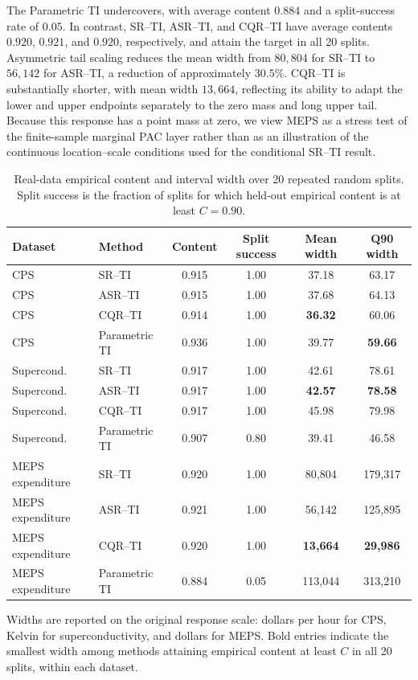 The Parametric TI undercovers, with average content \(0.884\) and a
split-success rate of \(0.05\). In contrast, SR--TI, ASR--TI, and CQR--TI have
average contents \(0.920\), \(0.921\), and \(0.920\), respectively, and attain
the target in all 20 splits. Asymmetric tail scaling reduces the mean width from
\(80{,}804\) for SR--TI to \(56{,}142\) for ASR--TI, a reduction of
approximately \(30.5\%\). CQR--TI is substantially shorter, with mean width
\(13{,}664\), reflecting its ability to adapt the lower and upper endpoints
separately to the zero mass and long upper tail. Because this response has a
point mass at zero, we view MEPS as a stress test of the finite-sample marginal
PAC layer rather than as an illustration of the continuous location--scale
conditions used for the conditional SR--TI result.

\begin{table}[H]
\centering
\caption{Real-data empirical content and interval width over 20 repeated random
splits. Split success is the fraction of splits for which held-out empirical
content is at least \(C=0.90\).}
\label{tab:real-data-summary}
\small
\begin{tabular}{llcccc}
\toprule
Dataset & Method & Content & Split success & Mean width & Q90 width \\
\midrule
CPS & SR--TI          & 0.915 & 1.00 & 37.18 & 63.17 \\
CPS & ASR--TI         & 0.915 & 1.00 & 37.68 & 64.13 \\
CPS & CQR--TI         & 0.914 & 1.00 & \textbf{36.32} & 60.06 \\
CPS & Parametric TI   & 0.936 & 1.00 & 39.77 & \textbf{59.66} \\
\midrule
Supercond. & SR--TI        & 0.917 & 1.00 & 42.61 & 78.61 \\
Supercond. & ASR--TI       & 0.917 & 1.00 & \textbf{42.57} & \textbf{78.58} \\
Supercond. & CQR--TI       & 0.917 & 1.00 & 45.98 & 79.98 \\
Supercond. & Parametric TI & 0.907 & 0.80 & 39.41 & 46.58 \\
\midrule
MEPS expenditure & SR--TI        & 0.920 & 1.00 & 80{,}804 & 179{,}317 \\
MEPS expenditure & ASR--TI       & 0.921 & 1.00 & 56{,}142 & 125{,}895 \\
MEPS expenditure & CQR--TI       & 0.920 & 1.00 & \textbf{13{,}664} & \textbf{29{,}986} \\
MEPS expenditure & Parametric TI & 0.884 & 0.05 & 113{,}044 & 313{,}210 \\
\bottomrule
\end{tabular}

\vspace{0.25em}
\begin{flushleft}
\footnotesize
Widths are reported on the original response scale: dollars per hour for CPS,
Kelvin for superconductivity, and dollars for MEPS. Bold entries indicate the
smallest width among methods attaining empirical content at least \(C\) in all
20 splits, within each dataset.
\end{flushleft}
\end{table}


